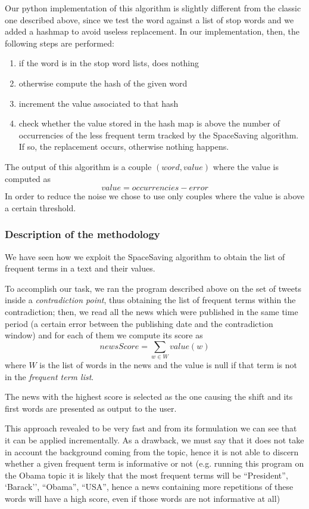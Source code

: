 Our python implementation of this algorithm is slightly different from the
classic one described above, since we test the word against a list of stop words
and we added a hashmap to avoid useless
replacement. In our implementation, then, the following steps are performed:
\begin{enumerate}
	\item if the word is in the stop word lists, does nothing
	\item otherwise compute the hash of the given word
	\item increment the value associated to that hash
	\item check whether the value stored in the hash map is above the number of
		occurrencies of the less frequent term tracked by the SpaceSaving
		algorithm. If so, the replacement occurs, otherwise nothing happens.
\end{enumerate}
The output of this algorithm is a couple $(word, value)$ where the value is
computed as 
\begin{displaymath}
	value = occurrencies - error
\end{displaymath}
In order to reduce the noise we chose to use only couples where the value is
above a certain threshold.

\subsubsection*{Description of the methodology}
We have seen how we exploit the SpaceSaving algorithm to obtain the list of
frequent terms in a text and their
values. 

To accomplish our task, we ran the program described above on the set of tweets inside a
\emph{contradiction point}, thus obtaining the list of frequent terms within the
contradiction; then, we read all the news which were published in the same time
period (a certain error between the publishing date and the contradiction
window) and for each of them we compute its score as
\begin{displaymath}
	newsScore = \sum_{w \in W} value(w)
\end{displaymath}
where $W$ is the list of words in the news and the value is null if that term is
not in the \emph{frequent term list}.

The news with the highest score is selected as the one causing the shift and its
first words are presented as output to the user.

This approach revealed to be very fast and from its formulation we can see that
it can be applied incrementally. As a drawback, we must say that it does not
take in account the background coming from the topic, hence it is not able to
discern whether a given frequent term is informative or not (e.g. running this
program on the Obama topic it is likely that the most
frequent terms will be ``President'', `Barack'', ``Obama'', ``USA'', hence a
news containing more repetitions of these words will have a high score, even if
those words are not informative at all)
